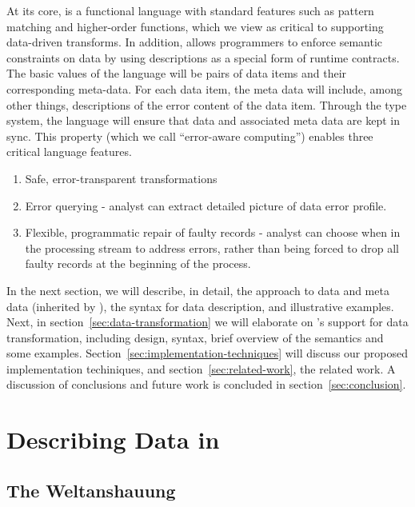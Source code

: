 \documentclass{entcs}
\begin{document}
At its core, \datatype{} is a functional language with standard
features such as pattern matching and higher-order functions, which we
view as critical to supporting data-driven transforms. In addition,
\datatype{} allows programmers to enforce semantic constraints on
data by using \datatype{} descriptions as a special form of runtime
contracts. The basic values of the language will be pairs of data
items and their corresponding meta-data. For each data item, the meta
data will include, among other things, descriptions of the error
content of the data item. Through the type system, the language will
ensure that data and associated meta data are kept in sync. This
property (which we call ``error-aware computing'') enables three
critical language features.
\begin{enumerate}
\item Safe, error-transparent transformations
\item Error querying - analyst can extract detailed picture of data
  error profile.
\item Flexible, programmatic repair of faulty records - analyst can
  choose when in the processing stream to address errors, rather than
  being forced to drop all faulty records at the beginning of the process.
\end{enumerate}

In the next section, we will describe, in detail, the \pads{} approach
to data and meta data (inherited by \datatype{}), the \datatype{}
syntax for data description, and illustrative examples. Next, in
section~\ref{sec:data-transformation} we will elaborate on
\datatype{}'s support for data transformation, including design,
syntax, brief overview of the semantics and some examples.
Section~\ref{sec:implementation-techniques} will discuss our proposed
implementation techiniques, and section~\ref{sec:related-work}, the
related work. A discussion of conclusions and future work is concluded
in section~\ref{sec:conclusion}.

\section{Describing Data in \datatype{}}
\label{sec:data-description}

\subsection{The \pads{} Weltanshauung}
\end{document}
